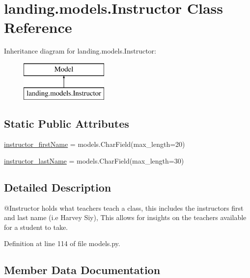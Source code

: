 \hypertarget{classlanding_1_1models_1_1Instructor}{}\section{landing.\+models.\+Instructor Class Reference}
\label{classlanding_1_1models_1_1Instructor}
Inheritance diagram for landing.\+models.\+Instructor\+:\begin{figure}[H]
\begin{center}
\leavevmode
\includegraphics[height=2.000000cm]{classlanding_1_1models_1_1Instructor}
\end{center}
\end{figure}
\subsection*{Static Public Attributes}
\begin{DoxyCompactItemize}
\item 
\mbox{\hyperlink{classlanding_1_1models_1_1Instructor_ad60012a76a46e3ca34f899b073ac3430}{instructor\+\_\+first\+Name}} = models.\+Char\+Field(max\+\_\+length=20)
\item 
\mbox{\hyperlink{classlanding_1_1models_1_1Instructor_a180b4ad797ed2552ab12d29699c56ca6}{instructor\+\_\+last\+Name}} = models.\+Char\+Field(max\+\_\+length=30)
\end{DoxyCompactItemize}


\subsection{Detailed Description}
\begin{DoxyVerb}@Instructor holds what teachers teach a class, this includes the
        instructors first and last name (i.e Harvey Siy),
        This allows for insights on the teachers available for a student to take.
\end{DoxyVerb}
 

Definition at line 114 of file models.\+py.



\subsection{Member Data Documentation}
\mbox{\label{classlanding_1_1models_1_1Instructor_ad60012a76a46e3ca34f899b073ac3430}} 
